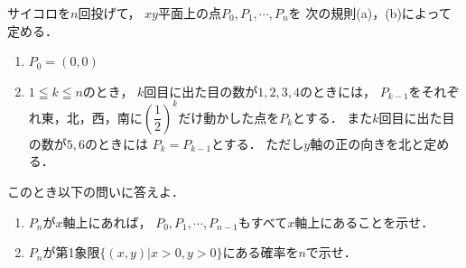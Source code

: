 \documentclass[../../main.tex]{subfiles}
\begin{document}
サイコロを$n$回投げて，
$xy$平面上の点$P_0,P_1,\cdots,P_n$を
次の規則(a)，(b)によって定める．
\begin{enumerate}
  \item[(a)] $P_0=(0,0)$
  \item[(b)] $1 \leqq k \leqq n$のとき，
    $k$回目に出た目の数が$1,2,3,4$のときには，
    $P_{k-1}$をそれぞれ東，北，西，南に$\displaystyle { \left( \dfrac{1}{2} \right) }^k$だけ動かした点を$P_k$とする．
    また$k$回目に出た目の数が$5,6$のときには
    $P_k=P_{k-1}$とする．
    ただし$y$軸の正の向きを北と定める．
\end{enumerate}
このとき以下の問いに答えよ．
\begin{enumerate}
  \item $P_n$が$x$軸上にあれば，
    $P_0,P_1,\cdots,P_{n-1}$もすべて$x$軸上にあることを示せ．
  \item $P_n$が第1象限$\{ (x,y)|x>0,y>0 \}$にある確率を$n$で示せ．
\end{enumerate}
\end{document}
